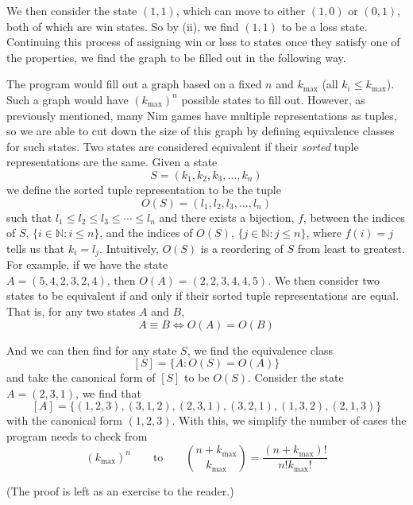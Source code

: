 \documentclass[12pt]{article}
\newcommand{\N}{\mathbb{N}}
\begin{document}
We then consider the state $(1,1)$, which can move to either $(1,0)$ or $(0,1)$, both of which are win states. So by (ii), we find $(1,1)$ to be a loss state. Continuing this process of assigning win or loss to states once they satisfy one of the properties, we find the graph to be filled out in the following way.

\begin{center}
\end{center}

The program would fill out a graph based on a fixed $n$ and $k_{\text{max}}$ (all $k_i \leq k_{\text{max}}$). Such a graph would have $(k_{\text{max}})^n$ possible states to fill out. However, as previously mentioned, many Nim games have multiple representations as tuples, so we are able to cut down the size of this graph by defining equivalence classes for such states. Two states are considered equivalent if their \emph{sorted} tuple representations are the same. Given a state
\[S = (k_1, k_2, k_3, \dots, k_n)\]
we define the sorted tuple representation to be the tuple
\[O(S) = (l_1, l_2, l_3, \dots, l_n)\]
such that $l_1 \leq l_2 \leq l_3 \leq \cdots \leq l_n$ and there exists a bijection, $f$, between the indices of $S$, $\{i\in\N: i\leq n\}$, and the indices of $O(S)$, $\{j\in\N: j\leq n\}$, where $f(i) = j$ tells us that $k_i=l_j$. Intuitively, $O(S)$ is a reordering of $S$ from least to greatest. For example, if we have the state $A = (5,4,2,3,2,4) \text{, then } O(A) = (2,2,3,4,4,5)$. We then consider two states to be equivalent if and only if their sorted tuple representations are equal. That is, for any two states $A$ and $B$,
\[A \equiv B \iff O(A) = O(B)\]

And we can then find for any state $S$, we find the equivalence class
\[[S] = \{A: O(S) = O(A)\}\]
and take the canonical form of $[S]$ to be $O(S)$. Consider the state $A = (2,3,1)$, we find that
\[[A] = \{(1,2,3), (3,1,2), (2,3,1), (3,2,1), (1,3,2), (2,1,3)\}\]
with the canonical form $(1,2,3)$. With this, we simplify the number of cases the program needs to check from \[(k_{\text{max}})^n \qquad \text{to} \qquad \binom{n+k_{\text{max}}}{k_{\text{max}}} = \frac{(n+k_{\text{max}})!}{n!k_{\text{max}}!}\]
\begin{center}
    (The proof is left as an exercise to the reader.)
\end{center}
\end{document}
